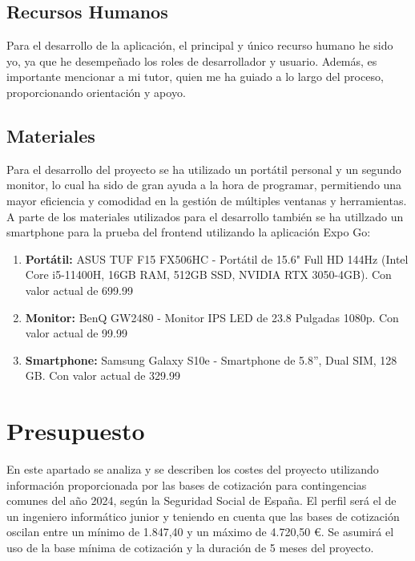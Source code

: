 \subsection{Recursos Humanos}

Para el desarrollo de la aplicación, el principal y único recurso humano he sido yo, ya que he desempeñado los roles de desarrollador y usuario. Además, es importante mencionar a mi tutor, quien me ha guiado a lo largo del proceso, proporcionando orientación y apoyo.

\subsection{Materiales}

Para el desarrollo del proyecto se ha utilizado un portátil personal y un segundo monitor, lo cual ha sido de gran ayuda a la hora de programar, permitiendo una mayor eficiencia y comodidad en la gestión de múltiples ventanas y herramientas. A parte de los materiales utilizados para el desarrollo también se ha utillzado un smartphone para la prueba del frontend utilizando la aplicación Expo Go:

\begin{enumerate}
    \item \textbf{Portátil:} ASUS TUF F15 FX506HC - Portátil de 15.6" Full HD 144Hz (Intel Core i5-11400H, 16GB RAM, 512GB SSD, NVIDIA RTX 3050-4GB). Con valor actual de 699.99 \EUR{} \cite{amazon_asus}

    \item \textbf{Monitor:} BenQ GW2480 - Monitor IPS LED de 23.8 Pulgadas 1080p. Con valor actual de 99.99 \EUR{} \cite{amazon_samsung}

    \item \textbf{Smartphone:} Samsung Galaxy S10e - Smartphone de 5.8”, Dual SIM, 128 GB. Con valor actual de 329.99 \EUR{} \cite{amazon_benq}
\end{enumerate}

\section{Presupuesto}

En este apartado se analiza y se describen los costes del proyecto utilizando información proporcionada por las bases de cotización para contingencias comunes del año 2024, según la Seguridad Social de España. El perfil será el de un ingeniero informático junior y teniendo en cuenta que las bases de cotización oscilan entre un mínimo de 1.847,40 \EUR{} y un máximo de 4.720,50 €. Se asumirá el uso de la base mínima de cotización y la duración de 5 meses del proyecto. \cite{seguridad_social}

